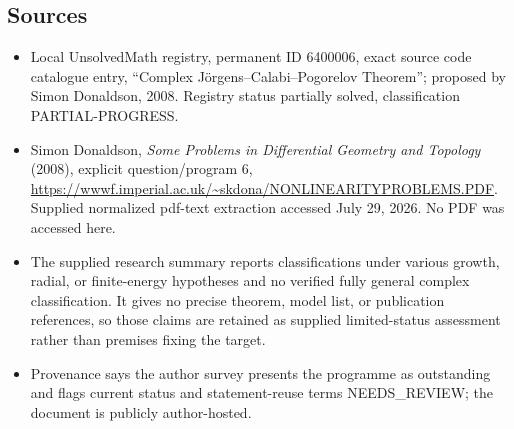 \documentclass[11pt]{article}
\begin{document}
\subsection{Sources}
\begin{itemize}
\item Local UnsolvedMath registry, permanent ID 6400006, exact source code catalogue entry, ``Complex J\"orgens--Calabi--Pogorelov Theorem''; proposed by Simon Donaldson, 2008. Registry status partially solved, classification PARTIAL-PROGRESS.
\item Simon Donaldson, \emph{Some Problems in Differential Geometry and Topology} (2008), explicit question/program 6, \url{https://wwwf.imperial.ac.uk/~skdona/NONLINEARITYPROBLEMS.PDF}. Supplied normalized pdf-text extraction accessed July 29, 2026. No PDF was accessed here.
\item The supplied research summary reports classifications under various growth, radial, or finite-energy hypotheses and no verified fully general complex classification. It gives no precise theorem, model list, or publication references, so those claims are retained as supplied limited-status assessment rather than premises fixing the target.
\item Provenance says the author survey presents the programme as outstanding and flags current status and statement-reuse terms NEEDS\_REVIEW; the document is publicly author-hosted.
\end{itemize}
\end{document}
